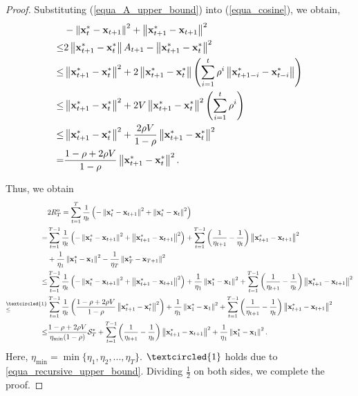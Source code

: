 \documentclass{article}
\begin{document}
\begin{proof}
Substituting  (\ref{equa_A_upper_bound}) into (\ref{equa_cosine}), we obtain,
\begin{align}
\nonumber
&-  \left\lVert{\bf x}_t^{\ast} - {\bf x}_{t+1}\right\rVert^2   + \left\lVert {\bf x}_{t+1}^{\ast} - {\bf x}_{t+1} \right\rVert^2 \\ \nonumber 
\le &  2 \left\lVert{\bf x}_{t+1}^{\ast} - {\bf x}_t^{\ast}\right\rVert A_{t+1} - \left\lVert{\bf x}_{t+1}^{\ast} - {\bf x}_t^{\ast}\right\rVert^2  \\ \nonumber
\le & \left\lVert{\bf x}_{t+1}^{\ast} - {\bf x}_t^{\ast}\right\rVert^2 + 2\left\lVert{\bf x}_{t+1}^{\ast} - {\bf x}_t^{\ast}\right\rVert \left( \sum\limits_{i=1}^{t}\rho^i \left\lVert{\bf x}_{t+1-i}^{\ast} - {\bf x}_{t-i}^{\ast}\right\rVert \right) \\ \nonumber
\le & \left\lVert{\bf x}_{t+1}^{\ast} - {\bf x}_t^{\ast}\right\rVert^2 + 2V\left\lVert{\bf x}_{t+1}^{\ast} - {\bf x}_t^{\ast}\right\rVert^2 \left( \sum\limits_{i=1}^{t}\rho^i  \right) \\ \nonumber
\le & \left\lVert{\bf x}_{t+1}^{\ast} - {\bf x}_t^{\ast}\right\rVert^2 + \frac{2\rho V}{1-\rho}\left\lVert{\bf x}_{t+1}^{\ast} - {\bf x}_t^{\ast}\right\rVert^2 \\ \label{equa_recursive_upper_bound}
= & \frac{1-\rho + 2\rho V}{1-\rho}\left\lVert{\bf x}_{t+1}^{\ast} - {\bf x}_t^{\ast}\right\rVert^2. 
\end{align} 




Thus, we obtain
\begin{align}
\nonumber
& 2R^{\mathrm{o}}_T = \sum\limits_{t=1}^{T} \frac{1}{\eta_t} \lrincir{-\lrnorm{\x_t^{\ast} - \x_{t+1}}^2   + \lrnorm { \x_t^{\ast} - \x_{t} }^2} \\ \nonumber
= & \sum\limits_{t=1}^{T-1} \frac{1}{\eta_t} \lrincir{-\lrnorm{\x_t^{\ast} - \x_{t+1}}^2   + \lrnorm { \x_{t+1}^{\ast} - \x_{t+1} }^2}  + \sum\limits_{t=1}^{T-1} \lrincir{\frac{1}{\eta_{t+1}} - \frac{1}{\eta_t}} \lrnorm { \x_{t+1}^{\ast} - \x_{t+1} }^2 \\ \nonumber 
& + \frac{1}{\eta_1} \lrnorm{\x_1^{\ast} - \x_1}^2 - \frac{1}{\eta_{T}}\lrnorm{\x_T^{\ast} - \x_{T+1}}^2 \\ \nonumber
\le & \sum\limits_{t=1}^{T-1} \frac{1}{\eta_t} \lrincir{-\lrnorm{\x_t^{\ast} - \x_{t+1}}^2   + \lrnorm { \x_{t+1}^{\ast} - \x_{t+1} }^2}  + \frac{1}{\eta_1} \lrnorm{\x_1^{\ast} - \x_1}^2 + \sum\limits_{t=1}^{T-1} \lrincir{\frac{1}{\eta_{t+1}} - \frac{1}{\eta_t}} \lrnorm { \x_{t+1}^{\ast} - \x_{t+1} }^2 \\ \nonumber
\refabovecir{\le}{\textcircled{1}} & \sum\limits_{t=1}^{T-1} \frac{1}{\eta_t} \lrincir{ \frac{1-\rho + 2\rho V}{1-\rho}\lrnorm {\x_{t+1}^{\ast} - \x_t^{\ast}}^2 }  + \frac{1}{\eta_1} \lrnorm{\x_1^{\ast} - \x_1}^2 + \sum\limits_{t=1}^{T-1} \lrincir{\frac{1}{\eta_{t+1}} - \frac{1}{\eta_t}} \lrnorm { \x_{t+1}^{\ast} - \x_{t+1} }^2 \\ \nonumber
\le & \frac{1-\rho + 2\rho V}{\eta_{\min}(1-\rho)} \Scal_T^{\ast} + \sum\limits_{t=1}^{T-1} \lrincir{\frac{1}{\eta_{t+1}} - \frac{1}{\eta_t}} \lrnorm { \x_{t+1}^{\ast} - \x_{t+1} }^2  + \frac{1}{\eta_1}\lrnorm{\x_1^{\ast} - \x_1}^2.
\end{align} Here, $\eta_{\min} = \min\{\eta_1, \eta_2 ,..., \eta_T\}$. $\textcircled{1}$ holds due to \eqref{equa_recursive_upper_bound}. Dividing $\frac{1}{2}$ on both sides, we complete the proof.
\end{proof}
\end{document}
